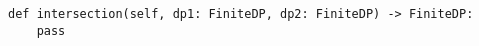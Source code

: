 \begin{verbatim}
def intersection(self, dp1: FiniteDP, dp2: FiniteDP) -> FiniteDP:
    pass
\end{verbatim}